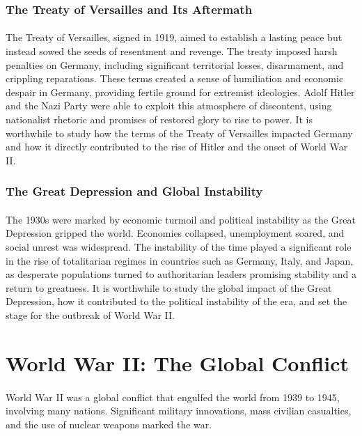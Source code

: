 \documentclass{book}
\begin{document}
\subsubsection*{The Treaty of Versailles and Its Aftermath}
\paragraph{}
The Treaty of Versailles, signed in 1919, aimed to establish a lasting peace but instead sowed the seeds of resentment and revenge. The treaty imposed harsh penalties on Germany, including significant territorial losses, disarmament, and crippling reparations. These terms created a sense of humiliation and economic despair in Germany, providing fertile ground for extremist ideologies. Adolf Hitler and the Nazi Party were able to exploit this atmosphere of discontent, using nationalist rhetoric and promises of restored glory to rise to power. It is worthwhile to study how the terms of the Treaty of Versailles impacted Germany and how it directly contributed to the rise of Hitler and the onset of World War II.

\subsubsection*{The Great Depression and Global Instability}
\paragraph{}
The 1930s were marked by economic turmoil and political instability as the Great Depression gripped the world. Economies collapsed, unemployment soared, and social unrest was widespread. The instability of the time played a significant role in the rise of totalitarian regimes in countries such as Germany, Italy, and Japan, as desperate populations turned to authoritarian leaders promising stability and a return to greatness. It is worthwhile to study the global impact of the Great Depression, how it contributed to the political instability of the era, and set the stage for the outbreak of World War II.

\section*{World War II: The Global Conflict}
\paragraph{}
World War II was a global conflict that engulfed the world from 1939 to 1945, involving many nations. Significant military innovations, mass civilian casualties, and the use of nuclear weapons marked the war.
\end{document}
